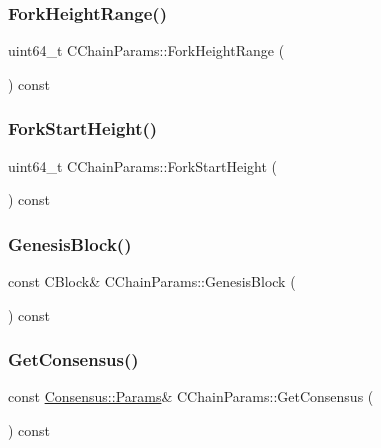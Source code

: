 \subsubsection{\texorpdfstring{Fork\+Height\+Range()}{ForkHeightRange()}}
{\footnotesize\ttfamily uint64\+\_\+t C\+Chain\+Params\+::\+Fork\+Height\+Range (\begin{DoxyParamCaption}{ }\end{DoxyParamCaption}) const\hspace{0.3cm}{\ttfamily [inline]}}

\mbox{\label{class_c_chain_params_a3512eb1ef7869e7b47f88aaa0ae687b3}} 
\subsubsection{\texorpdfstring{Fork\+Start\+Height()}{ForkStartHeight()}}
{\footnotesize\ttfamily uint64\+\_\+t C\+Chain\+Params\+::\+Fork\+Start\+Height (\begin{DoxyParamCaption}{ }\end{DoxyParamCaption}) const\hspace{0.3cm}{\ttfamily [inline]}}

\mbox{\label{class_c_chain_params_aebd6cb9d986eeb2e6c228c04b3c39b42}} 
\subsubsection{\texorpdfstring{Genesis\+Block()}{GenesisBlock()}}
{\footnotesize\ttfamily const C\+Block\& C\+Chain\+Params\+::\+Genesis\+Block (\begin{DoxyParamCaption}{ }\end{DoxyParamCaption}) const\hspace{0.3cm}{\ttfamily [inline]}}

\mbox{\label{class_c_chain_params_aa366d4f63c8d16d625336dca61ca65e5}} 
\subsubsection{\texorpdfstring{Get\+Consensus()}{GetConsensus()}}
{\footnotesize\ttfamily const \mbox{\hyperlink{chainparams_8h_a5e1ca1b35c3dd1a4e20f18445f28dd9c}{Consensus\+::\+Params}}\& C\+Chain\+Params\+::\+Get\+Consensus (\begin{DoxyParamCaption}{ }\end{DoxyParamCaption}) const\hspace{0.3cm}{\ttfamily [inline]}}

